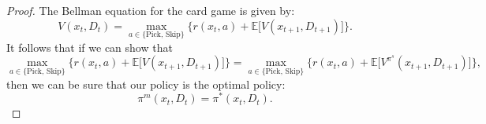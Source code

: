 \documentclass{article}
\begin{document}
\begin{proof}
    The Bellman equation for the card game is given by:
    \begin{equation}
        V(x_t, D_t) =  \max_{a \in \{\text{Pick, Skip}\}}\Big\{r(x_t,a) + \mathbb{E}\Big[V(x_{t+1}, D_{t+1})\Big]\Big\}.
    \end{equation}
    It follows that if we can show that
    \begin{equation}
        \max_{a \in \{\text{Pick, Skip}\}}\Big\{r(x_t,a) + \mathbb{E}\Big[V(x_{t+1}, D_{t+1})\Big]\Big\} = \max_{a \in \{\text{Pick, Skip}\}}\Big\{r(x_t,a) + \mathbb{E}\Big[V^{\pi^s}(x_{t+1}, D_{t+1})\Big]\Big\},
    \end{equation}
    then  we can be sure that our policy is the optimal policy:
    \begin{equation}
        \pi^m(x_t, D_t) = \pi^*(x_t, D_t).
    \end{equation}
\end{proof}
\end{document}
